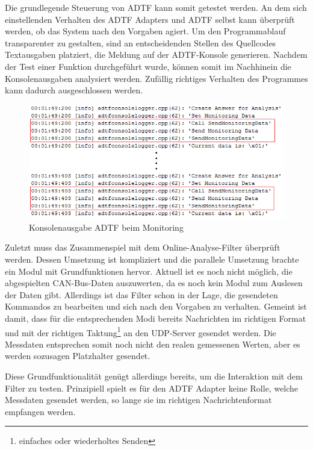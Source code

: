 \documentclass[12pt,a4paper]{report}
\begin{document}
Die grundlegende Steuerung von ADTF kann somit getestet werden. An dem sich einstellenden Verhalten des ADTF Adapters und ADTF selbst kann überprüft werden, ob das System nach den Vorgaben agiert. Um den Programmablauf transparenter zu gestalten, sind an entscheidenden Stellen des Quellcodes Textausgaben platziert, die Meldung auf der ADTF-Konsole generieren. Nachdem der Test einer Funktion durchgeführt wurde, können somit im Nachhinein die Konsolenausgaben analysiert werden. Zufällig richtiges Verhalten des Programmes kann dadurch ausgeschlossen werden.
\begin{figure}
\begin{center}
\includegraphics[width=1\linewidth]{Darstellungen/MonitoringTakt}
\caption{Konsolenausgabe ADTF beim Monitoring}\label{pic:Konsolenausgabe Monitoring}
\end{center}
\end{figure}
Zuletzt muss das Zusammenspiel mit dem Online-Analyse-Filter überprüft werden. Dessen Umsetzung ist kompliziert und die parallele Umsetzung brachte ein Modul mit Grundfunktionen hervor. Aktuell ist es noch nicht möglich, die abgespielten CAN-Bus-Daten auszuwerten, da es noch kein Modul zum Auslesen der Daten gibt. Allerdings ist das Filter schon in der Lage, die gesendeten Kommandos zu bearbeiten und sich nach den Vorgaben zu verhalten. Gemeint ist damit, dass für die entsprechenden Modi bereits Nachrichten im richtigen Format und mit der richtigen Taktung\footnote{einfaches oder wiederholtes Senden} an den UDP-Server gesendet werden. Die Messdaten entsprechen somit noch nicht den realen gemessenen Werten, aber es werden sozusagen Platzhalter gesendet.

Diese Grundfunktionalität genügt allerdings bereits, um die Interaktion mit dem Filter zu testen. Prinzipiell spielt es für den ADTF Adapter keine Rolle, welche Messdaten gesendet werden, so lange sie im richtigen Nachrichtenformat empfangen werden.
\end{document}
